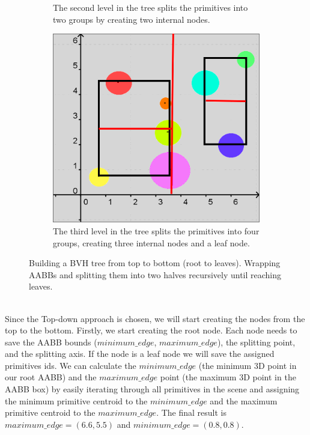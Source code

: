 \documentclass[11pt,a4paper]{article}
\begin{document}
\begin{figure}[h]
\begin{subfigure}[t]{0.3\textwidth}
         \captionsetup{justification=centering,margin=0.1cm}
         \caption{The second level in the tree splits the primitives into two groups by creating two internal nodes.}
         \label{fig:pi_5000}
     \end{subfigure}
     \hfill
     \begin{subfigure}[t]{0.3\textwidth}
         \centering
         \includegraphics[width=\textwidth]{images/example_bvh/4_g.png}
         \captionsetup{justification=centering,margin=0.1cm}
         \caption{The third level in the tree splits the primitives into four groups, creating three internal nodes and a leaf node.}
         \label{fig:pi_18000}
     \end{subfigure}
        \captionsetup{justification=centering,margin=2cm}
        \caption{Building a BVH tree from top to bottom (root to leaves). Wrapping AABBs and splitting them into two halves recursively until reaching leaves.}
        \label{fig:three graphs}
\end{figure}

\noindent
\\
Since the Top-down approach is chosen, we will start creating the nodes from the top to the bottom. Firstly, we start creating the root node. Each node needs to save the AABB bounds ($minimum\_edge$, $maximum\_edge$), the splitting point, and the splitting axis. If the node is a leaf node we will save the assigned primitives ids.  We can calculate the $minimum\_edge$ (the minimum 3D point in our root AABB) and the $maximum\_edge$ point (the maximum 3D point in the AABB box) by easily iterating through all primitives in the scene and assigning the minimum primitive centroid to the  $minimum\_edge$ and the maximum primitive centroid to the $maximum\_edge$. The final result is $maximum\_edge = (6.6, 5.5)$ and  $minimum\_edge = (0.8,0.8)$.
\end{document}
